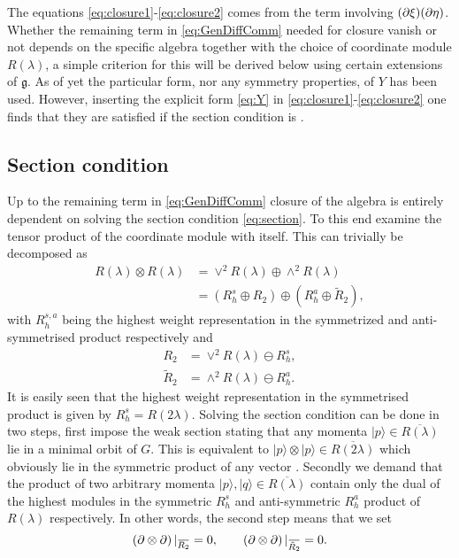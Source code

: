 The equations \eqref{eq:closure1}-\eqref{eq:closure2} comes from the term involving $(\partial\xi)(\partial\eta)$. Whether the remaining term in \eqref{eq:GenDiffComm} needed for closure vanish or not depends on the specific algebra together with the choice of coordinate module $R(\lambda)$, a simple criterion for this will be derived below using certain extensions of $\mathfrak{g}$. As of yet the particular form, nor any symmetry properties, of $Y$ has been used. However, inserting the explicit form \eqref{eq:Y} in \eqref{eq:closure1}-\eqref{eq:closure2} one finds that they are satisfied if the section condition is \cite{Palmkvist2015ExpGeomSuperAlg}.

\subsection{Section condition}
Up to the remaining term in \eqref{eq:GenDiffComm} closure of the algebra is entirely dependent on solving the section condition \eqref{eq:section}. To this end examine the tensor product of the coordinate module with itself. This can trivially be decomposed as
\begin{equation}\label{eq:SectionConditionReps}
    \begin{aligned}
        R(\lambda)\otimes R(\lambda) &= \vee^2 R(\lambda)\oplus \wedge^2R(\lambda)\\
        &= \left(R_h^s\oplus R_2\right)\oplus\left(R_h^a\oplus \tilde{R}_2\right),
    \end{aligned}
\end{equation}
with $R_h^{s,a}$ being the highest weight representation in the symmetrized and anti-symmetrised product respectively and
\begin{align}
    R_2 &= \vee^2 R(\lambda)\ominus R_h^s,\\
    \tilde{R}_2 &= \wedge^2R(\lambda)\ominus  R_h^a.
\end{align}
It is easily seen that the highest weight representation in the symmetrised product is given by $R_h^s=R(2\lambda)$. Solving the section condition can be done in two steps, first impose the weak section stating that any momenta $|p\rangle\in \overbar{R(\lambda)}$ lie in a minimal orbit of $G$. This is equivalent to $|p\rangle\otimes|p\rangle \in \overbar{R(2\lambda)}$ which obviously lie in the symmetric product of any vector \cite{Berman2013,Bossard2017}. Secondly we demand that the product of two arbitrary momenta $|p\rangle,|q\rangle\in\overbar{R(\lambda)}$ contain only the dual of the highest modules in the symmetric $R^s_h$ and anti-symmetric $R^a_h$ product of $R(\lambda)$ respectively. In other words, the second step means that we set 
\begin{equation}
    \left(\pd\otimes\pd\right)|_{\overbar{R_2}} = 0, \qquad \left(\pd\otimes\pd\right)|_{\overbar{\tilde{R}_2}} =0.
\end{equation}

